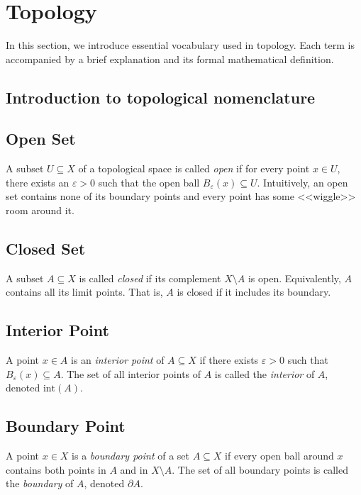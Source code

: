 \section{Topology}

In this section, we introduce essential vocabulary used in topology. Each term is accompanied by a brief explanation and its formal mathematical definition.

\subsection{Introduction to topological nomenclature}

	 \subsection{Open Set}
	      A subset \( U \subseteq X \) of a topological space is called \emph{open} if for every point \( x \in U \), there exists an \( \varepsilon > 0 \) such that the open ball \( B_\varepsilon(x) \subseteq U \). 
	      Intuitively, an open set contains none of its boundary points and every point has some <<wiggle>> room around it.

	 \subsection{Closed Set} 
	      A subset \( A \subseteq X \) is called \emph{closed} if its complement \( X \setminus A \) is open. Equivalently, \( A \) contains all its limit points. 
	      That is, \( A \) is closed if it includes its boundary.

	 \subsection{Interior Point}
	      A point \( x \in A \) is an \emph{interior point} of \( A \subseteq X \) if there exists \( \varepsilon > 0 \) such that \( B_\varepsilon(x) \subseteq A \). 
	      The set of all interior points of \( A \) is called the \emph{interior} of \( A \), denoted \( \mathrm{int}(A) \).

	 \subsection{Boundary Point}
	      A point \( x \in X \) is a \emph{boundary point} of a set \( A \subseteq X \) if every open ball around \( x \) contains both points in \( A \) and in \( X \setminus A \). 
	      The set of all boundary points is called the \emph{boundary} of \( A \), denoted \( \partial A \).

